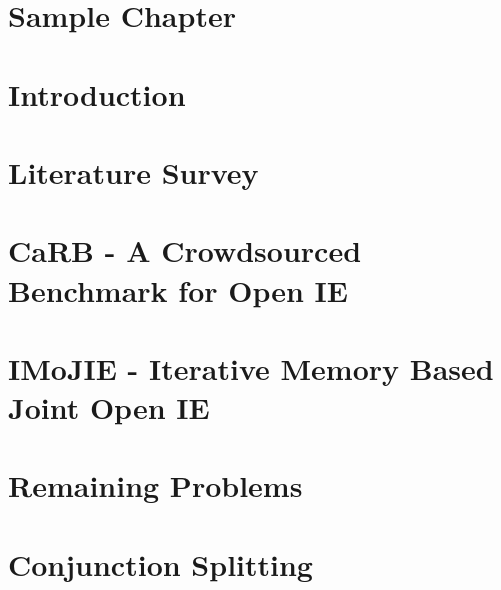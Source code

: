 \documentclass[BTech]{iitddiss}
\begin{document}

\chapter{Sample Chapter}
\label{chap:sample}



\chapter{Introduction}
\label{chap:intro}



\chapter{Literature Survey}
\label{chap:literature_survey}



\chapter{CaRB - A Crowdsourced Benchmark for Open IE}
\label{chap:carb}



\chapter{IMoJIE - Iterative Memory Based Joint Open IE}
\label{chap:imojie}



\chapter{Remaining Problems}
\label{chap:remaining_problems}



\chapter{Conjunction Splitting}
\label{chap:conjunction_splitting}

\end{document}
